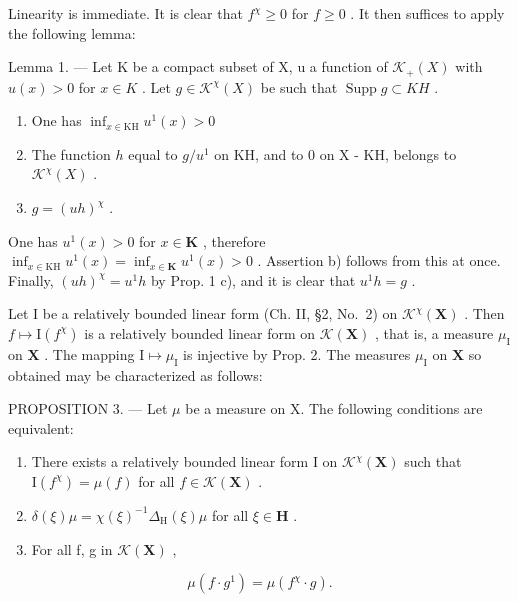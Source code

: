 Linearity is immediate. It is clear that \(f^{\chi} \geqslant 0\) for \(f \geqslant 0\) . It then suffices to apply the following lemma:

Lemma 1. --- Let K be a compact subset of X, u a function of \(\mathcal{K}_{+}(X)\) with \(u(x) > 0\) for \(x \in K\) . Let \(g \in \mathcal{K}^{\chi}(X)\) be such that \(\operatorname{Supp} g \subset KH\) .

\begin{enumerate}
\def\labelenumi{\alph{enumi})}
\item
  One has \(\inf_{x\in \mathrm{KH}}u^1 (x) > 0\)
\item
  The function \(h\) equal to \(g / u^1\) on KH, and to 0 on X - KH, belongs to \(\mathcal{K}^{\chi}(X)\) .
\item
  \(g = (uh)^{\chi}\) .
\end{enumerate}

One has \(u^1(x) > 0\) for \(x \in \mathbf{K}\) , therefore \(\inf_{x \in \mathrm{KH}} u^1(x) = \inf_{x \in \mathbf{K}} u^1(x) > 0\) . Assertion b) follows from this at once. Finally, \((uh)^{\chi} = u^{1}h\) by Prop. 1 c), and it is clear that \(u^1h = g\) .

Let I be a relatively bounded linear form (Ch. II, §2, No.~2) on \(\mathcal{K}^{\chi}(\mathbf{X})\) . Then \(f \mapsto \mathrm{I}(f^{\chi})\) is a relatively bounded linear form on \(\mathcal{K}(\mathbf{X})\) , that is, a measure \(\mu_{\mathrm{I}}\) on \(\mathbf{X}\) . The mapping \(\mathrm{I} \mapsto \mu_{\mathrm{I}}\) is injective by Prop. 2. The measures \(\mu_{\mathrm{I}}\) on \(\mathbf{X}\) so obtained may be characterized as follows:

PROPOSITION 3. --- Let \(\mu\) be a measure on X. The following conditions are equivalent:

\begin{enumerate}
\def\labelenumi{\alph{enumi})}
\item
  There exists a relatively bounded linear form I on \(\mathcal{K}^{\chi}(\mathbf{X})\) such that \(\mathrm{I}(f^{\chi}) = \mu(f)\) for all \(f\in \mathcal{K}(\mathbf{X})\) .
\item
  \(\delta (\xi)\mu = \chi (\xi)^{-1}\Delta_{\mathrm{H}}(\xi)\mu\) for all \(\xi \in \mathbf{H}\) .
\item
  For all f, g in \(\mathcal{K}(\mathbf{X})\) ,
\end{enumerate}

\[
\mu (f \cdot g ^ {1}) = \mu (f ^ {\chi} \cdot g).\tag{2}
\]

